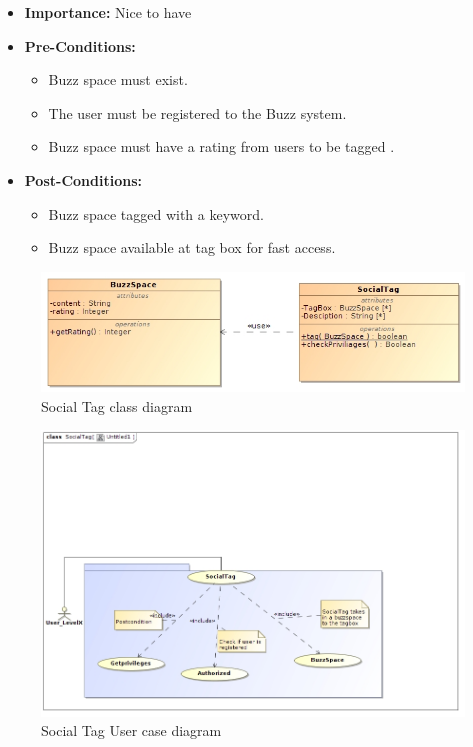 \documentclass[11pt]{article}
\begin{document}
\begin{enumerate}
\begin{itemize}
\item \textbf{Importance:} Nice to have
\item \textbf{Pre-Conditions: }
	\begin{itemize}
		\item Buzz space must exist.
		\item The user must be registered to the Buzz system.
		\item Buzz space must have a rating from users to be tagged .
	\end{itemize}

\item \textbf{Post-Conditions: }
	\begin{itemize}
	\item Buzz space tagged with a keyword.
	\item Buzz space available at tag box for fast access.
	\end{itemize}
\end{itemize}

\begin{figure}[H]	
\graphicspath{ {../Diagrams/sfiso/} }
    	\includegraphics[scale=0.5,center]{socialC.jpg}
    	\caption{Social Tag class  diagram}
	\end{figure}
	\begin{figure}[H]	
\graphicspath{ {../Diagrams/sfiso/} }
    	\includegraphics[scale=0.5,center]{socialtag.jpg}
    	\caption{Social Tag User case diagram}
	\end{figure}


\end{enumerate}
\end{document}
